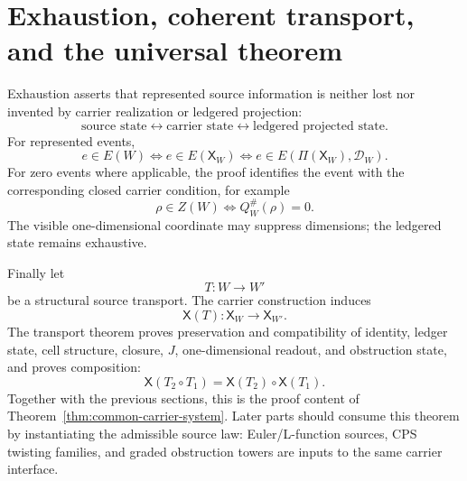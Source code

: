 \documentclass[11pt]{article}
\theoremstyle{definition}
\begin{document}
\section{Exhaustion, coherent transport, and the universal theorem}\label{sec:exhaustion-transport-universal}

Exhaustion asserts that represented source information is neither lost nor
invented by carrier realization or ledgered projection:
\[
\text{source state}
\leftrightarrow
\text{carrier state}
\leftrightarrow
\text{ledgered projected state}.
\]
For represented events,
\[
e\in E(W)
\iff
e\in E(\mathsf X_W)
\iff
e\in E(\Pi(\mathsf X_W),\mathcal D_W).
\]
For zero events where applicable, the proof identifies the event with the
corresponding closed carrier condition, for example
\[
\rho\in Z(W)\iff Q_W^\#(\rho)=0.
\]
The visible one-dimensional coordinate may suppress dimensions; the ledgered
state remains exhaustive.

Finally let
\[
T:W\to W'
\]
be a structural source transport.  The carrier construction induces
\[
\mathsf X(T):\mathsf X_W\to\mathsf X_{W'}.
\]
The transport theorem proves preservation and compatibility of identity,
ledger state, cell structure, closure, \(J\), one-dimensional readout, and
obstruction state, and proves composition:
\[
\mathsf X(T_2\circ T_1)=\mathsf X(T_2)\circ\mathsf X(T_1).
\]
Together with the previous sections, this is the proof content of
Theorem~\ref{thm:common-carrier-system}.  Later parts should consume this
theorem by instantiating the admissible source law: Euler/L-function sources,
CPS twisting families, and graded obstruction towers are inputs to the same
carrier interface.

\iffalse
\noindent\textbf{Proof obligations to isolate.}
\begin{enumerate}
\item Define the source event set \(E(W)\), carrier event set
\(E(\mathsf X_W)\), and ledgered projected event set
\(E(\Pi(\mathsf X_W),\mathcal D_W)\).
\item Prove event exhaustion:
\[
e\in E(W)
\iff
e\in E(\mathsf X_W)
\iff
e\in E(\Pi(\mathsf X_W),\mathcal D_W).
\]
\item For zero events, prove the relevant closed-carrier equivalence, for
example
\[
\rho\in Z(W)\iff Q_W^\#(\rho)=0.
\]
\item Given a structural transport \(T:W\to W'\), construct the induced carrier
transport
\[
\mathsf X(T):\mathsf X_W\to\mathsf X_{W'}.
\]
\item Prove preservation of identity, ledger state, cell structure, closure,
\(J\), one-dimensional readout, and obstruction state.
\item Prove transport composition:
\[
\mathsf X(T_2\circ T_1)=\mathsf X(T_2)\circ\mathsf X(T_1).
\]
\item Assemble the section theorems as the proof of
Theorem~\ref{thm:common-carrier-system}.
\end{enumerate}
\fi
\end{document}
